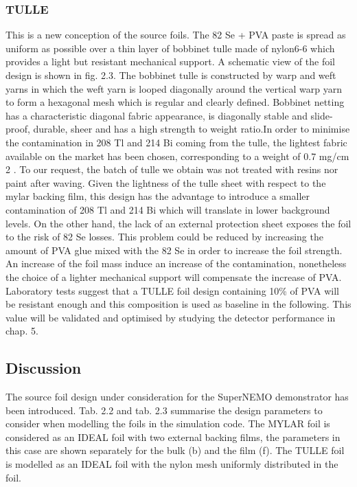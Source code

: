 \documentclass[main.tex]{subfiles}
\begin{document}
\subsubsection{TULLE}


\NI This is a new conception of the source foils. The 82 Se + PVA paste is spread as uniform as possible over a thin layer of bobbinet tulle made of nylon6-6 which provides a light but resistant mechanical support. A schematic view of the foil design is shown in fig. 2.3. The bobbinet tulle is constructed by warp and weft yarns in which the weft yarn is looped diagonally around the vertical warp yarn to form a hexagonal mesh which is regular and clearly defined. Bobbinet netting has a characteristic diagonal fabric appearance, is diagonally stable and slide-proof, durable, sheer and has a high strength to weight ratio.In order to minimise the contamination in 208 Tl and 214 Bi coming from the tulle, the lightest fabric available on the market has been chosen, corresponding to a weight of 0.7 mg/cm 2 . To our request, the batch of tulle we obtain was not treated with resins nor paint after waving. Given the lightness of the tulle sheet with respect to the mylar backing film, this design has the advantage to introduce a smaller contamination of 208 Tl and 214 Bi which will translate in lower background levels. On the other hand, the lack of an external protection sheet exposes the foil to the risk of 82 Se losses. This problem could be reduced by increasing the amount of PVA glue mixed with the 82 Se in order to increase the foil strength. An increase of the foil mass induce an increase of the contamination, nonetheless the choice of a lighter mechanical support will compensate the increase of PVA. Laboratory tests suggest that a TULLE foil design containing 10\% of PVA will be resistant enough and this composition is used as baseline in the following. This value will be validated and optimised by studying the detector performance in chap. 5.


\subsection{Discussion}


\NI The source foil design under consideration for the SuperNEMO demonstrator has been introduced. Tab. 2.2 and tab. 2.3 summarise the design parameters to consider when modelling the foils in the simulation code. The MYLAR foil is considered as an IDEAL foil with two external backing films, the parameters in this case are shown separately for the bulk (b) and the film (f). The TULLE foil is modelled as an IDEAL foil with the nylon mesh uniformly distributed in the foil.
\end{document}
